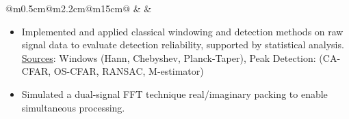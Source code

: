 \documentclass[10pt,a4paper]{article}
\begin{document}
\vspace{1.3em}                       
\begin{tabular}{@{}m{0.5cm}@{\hspace{0.5em}}m{2.2cm}@{\hspace{0.5em}}m{15cm}@{}}
   & 
  \raisebox{1em}{\begin{minipage}[t]{\linewidth}
  \centering
    \textcolor{blocktitle1_color}{Jun. 23}\\
    \textcolor{blocktitle1_color}{Oct. 23}
  \end{minipage} 
  } &
\end{tabular}


                         
\vspace{1em}
\begin{itemize}[leftmargin=*]
  \item Implemented and applied classical windowing and detection methods on raw signal data to evaluate detection reliability, supported by statistical analysis. 
  \\ {\fontsize{10pt}{10pt}\selectfont\textcolor{blocktext2_color}{\href{https://amr-aboughazala.super.site/data-analysis}{Sources}: Windows (Hann, Chebyshev, Planck-Taper), Peak Detection: (CA-CFAR, OS-CFAR, RANSAC, M-estimator)}}
  \item Simulated a dual-signal FFT technique real/imaginary packing to enable simultaneous processing.
\end{itemize}
\end{document}
